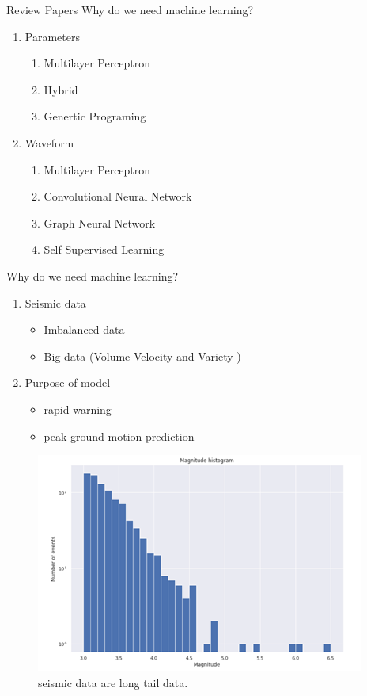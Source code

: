 \documentclass{beamer}
\begin{document}
	\begin{frame}[t]{Review Papers}
		Why do we need machine learning?\\
		
		\vspace{10pt}
		\begin{enumerate}
			\item Parameters
			\begin{enumerate}
				\item Multilayer Perceptron
				\item Hybrid
				\item Genertic Programing
			\end{enumerate}
			\vspace{10pt}
			\item Waveform
			\begin{enumerate}
				\item Multilayer Perceptron
				\item Convolutional Neural Network
				\item Graph Neural Network
				\item Self Supervised Learning
			\end{enumerate}
		\end{enumerate}
	\end{frame}
	
	\begin{frame}[t]{Why do we need machine learning?}
		\begin{enumerate}
			\item Seismic data
				\begin{itemize}
					\item Imbalanced data
					\item Big data (Volume  Velocity and Variety )
				\end{itemize}
			\item Purpose of model
				\begin{itemize}
					\item rapid warning
					\item peak ground motion prediction
				\end{itemize}
		\end{enumerate}
	
		\begin{figure}
			\includegraphics[scale=0.5]{imb.png}
			\caption{seismic data are long tail data.}
		\end{figure}
	\end{frame}
\end{document}

